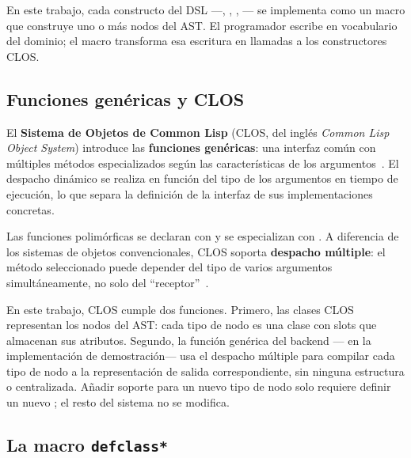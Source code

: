 En este trabajo, cada constructo del DSL ---,
, , --- se implementa como
un macro que construye uno o más nodos del AST.  El programador escribe en
vocabulario del dominio; el macro transforma esa escritura en llamadas a
los constructores CLOS.

\subsection{Funciones gen\'ericas y CLOS}
\label{ssec:clos}

El \textbf{Sistema de Objetos de Common Lisp} (CLOS, del inglés
\textit{Common Lisp Object System}) introduce las \textbf{funciones
genéricas}: una interfaz común con múltiples métodos especializados según
las características de los argumentos~\cite{clos1988}.  El despacho dinámico
se realiza en función del tipo de los argumentos en tiempo de ejecución,
lo que separa la definición de la interfaz de sus implementaciones concretas.

Las funciones polimórficas se declaran con  y se especializan
con .  A diferencia de los sistemas de objetos convencionales,
CLOS soporta \textbf{despacho múltiple}: el método seleccionado puede
depender del tipo de varios argumentos simultáneamente, no solo del
``receptor''~\cite{kiczales1991}.

En este trabajo, CLOS cumple dos funciones.  Primero, las clases CLOS
representan los nodos del AST: cada tipo de nodo es una clase con slots que
almacenan sus atributos.  Segundo, la función genérica del backend
--- en la implementación de demostración--- usa
el despacho múltiple para compilar cada tipo de nodo a la representación de
salida correspondiente, sin ninguna estructura  o 
centralizada.  Añadir soporte para un nuevo tipo de nodo solo requiere
definir un nuevo ; el resto del sistema no se modifica.

\subsection{La macro \texttt{defclass*}}
\label{ssec:defclass-star}

